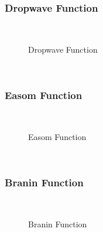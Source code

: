 \subsubsection{Dropwave Function}
~
\begin{figure}[ht]
	\centering
	\setlength \fboxsep{0pt}
	\setlength \fboxrule{0.5pt}
	\caption{Dropwave Function}
	\label{fig:DropwaveGraph}
\end{figure}
~
\subsubsection{Easom Function}
~
\begin{figure}[ht]
	\centering
	\setlength \fboxsep{0pt}
	\setlength \fboxrule{0.5pt}
	\caption{Easom Function}
	\label{fig:EasomGraph}
\end{figure}
~
\subsubsection{Branin Function}
~
\begin{figure}[ht]
	\centering
	\setlength \fboxsep{0pt}
	\setlength \fboxrule{0.5pt}
	\caption{Branin Function}
	\label{fig:BraninGraph}
\end{figure}
~
